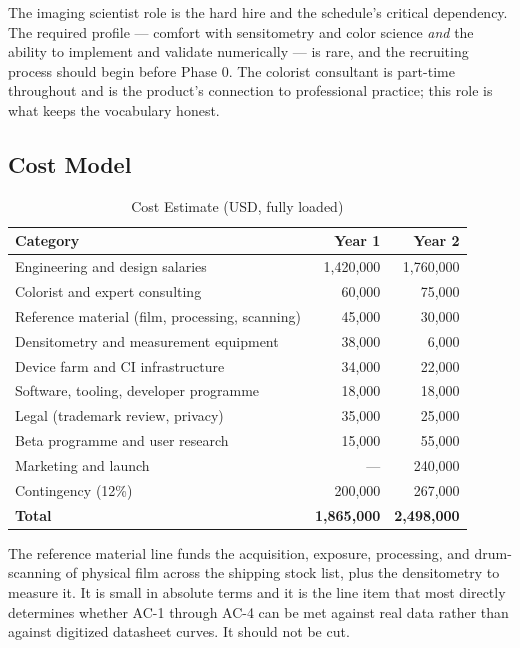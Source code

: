 The imaging scientist role is the hard hire and the schedule's critical
dependency. The required profile --- comfort with sensitometry and color science
\emph{and} the ability to implement and validate numerically --- is rare, and
the recruiting process should begin before Phase 0. The colorist consultant is
part-time throughout and is the product's connection to professional practice;
this role is what keeps the vocabulary honest.

\subsection{Cost Model}

\begin{table}[htbp]
\caption{Cost Estimate (USD, fully loaded)}
\label{tab:cost}
\begin{center}
\renewcommand{\arraystretch}{1.15}
\begin{tabular}{@{}lrr@{}}
\toprule
\textbf{Category} & \textbf{Year 1} & \textbf{Year 2} \\
\midrule
Engineering and design salaries & 1{,}420{,}000 & 1{,}760{,}000 \\
Colorist and expert consulting & 60{,}000 & 75{,}000 \\
Reference material (film, processing, scanning) & 45{,}000 & 30{,}000 \\
Densitometry and measurement equipment & 38{,}000 & 6{,}000 \\
Device farm and CI infrastructure & 34{,}000 & 22{,}000 \\
Software, tooling, developer programme & 18{,}000 & 18{,}000 \\
Legal (trademark review, privacy) & 35{,}000 & 25{,}000 \\
Beta programme and user research & 15{,}000 & 55{,}000 \\
Marketing and launch & --- & 240{,}000 \\
Contingency (12\%) & 200{,}000 & 267{,}000 \\
\midrule
\textbf{Total} & \textbf{1{,}865{,}000} & \textbf{2{,}498{,}000} \\
\bottomrule
\end{tabular}
\end{center}
\end{table}

The reference material line funds the acquisition, exposure, processing, and
drum-scanning of physical film across the shipping stock list, plus the
densitometry to measure it. It is small in absolute terms and it is the line item
that most directly determines whether AC-1 through AC-4 can be met against real
data rather than against digitized datasheet curves. It should not be cut.

